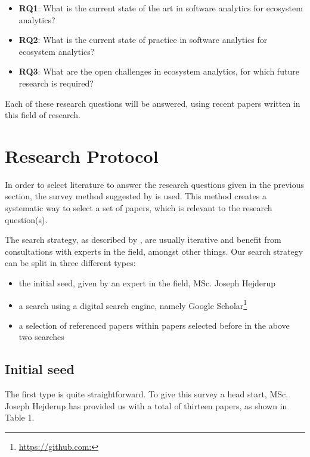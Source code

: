 \documentclass[]{book}
\providecommand{\tightlist}{%
  \setlength{\itemsep}{0pt}\setlength{\parskip}{0pt}}
\let\rmarkdownfootnote\footnote%
\def\footnote{\protect\rmarkdownfootnote}
\begin{document}
\begin{itemize}
\tightlist
\item
  \textbf{RQ1}: What is the current state of the art in software
  analytics for ecosystem analytics?
\item
  \textbf{RQ2}: What is the current state of practice in software
  analytics for ecosystem analytics?
\item
  \textbf{RQ3}: What are the open challenges in ecosystem analytics, for
  which future research is required?
\end{itemize}

Each of these research questions will be answered, using recent papers
written in this field of research.

\section{Research Protocol}\label{research-protocol-3}

In order to select literature to answer the research questions given in
the previous section, the survey method suggested by
\citet{Kitchenham2004} is used. This method creates a systematic way to
select a set of papers, which is relevant to the research question(s).

The search strategy, as described by \citet{Kitchenham2004}, are usually
iterative and benefit from consultations with experts in the field,
amongst other things. Our search strategy can be split in three
different types:

\begin{itemize}
\tightlist
\item
  the initial seed, given by an expert in the field, MSc. Joseph
  Hejderup
\item
  a search using a digital search engine, namely Google
  Scholar\footnote{\url{https://github.com:}}
\item
  a selection of referenced papers within papers selected before in the
  above two searches
\end{itemize}

\subsection{Initial seed}\label{initial-seed}

The first type is quite straightforward. To give this survey a head
start, MSc. Joseph Hejderup has provided us with a total of thirteen
papers, as shown in Table 1.
\end{document}

